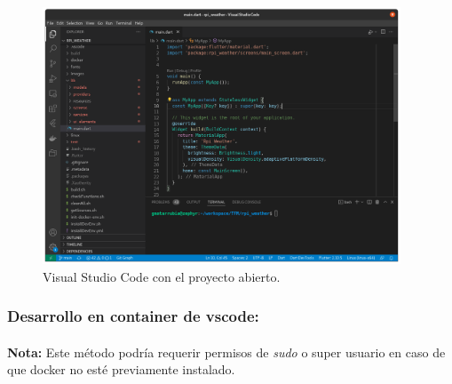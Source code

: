 \begin{figure}[H]
    \centering
    \includegraphics[width=0.95\textwidth]{imgs/vscode-ready}
	\caption[Visual Studio Code]{Visual Studio Code con el proyecto abierto.}
	\label{imgs:vscode-ready}
\end{figure}

\subsubsection{Desarrollo en container de \Gls{vscode}:}

\paragraph{}\textbf{Nota:} Este método podría requerir permisos de \emph{sudo} o super
usuario en caso de que docker no esté previamente instalado.

